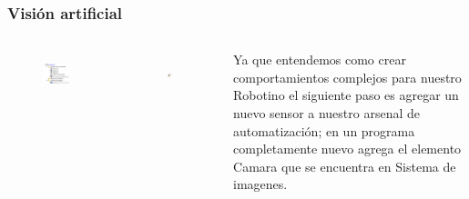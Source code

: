 \begin{frame}
	\frametitle{Visión artificial}
	\begin{columns}
		\begin{figure}
			\begin{center}
				\includegraphics[width=0.8\textwidth]{images/01-vision-artificial/01-01.png}
				\label{fig:vision-01-01}
			\end{center}
		\end{figure}
		\begin{figure}
			\begin{center}
				\includegraphics[width=0.4\textwidth]{images/01-vision-artificial/01-02.png}
				\label{fig:vision-01-02}
			\end{center}
		\end{figure}

		Ya que entendemos como crear comportamientos complejos para nuestro Robotino el siguiente paso es agregar un nuevo sensor a nuestro arsenal de automatización; en un programa completamente nuevo agrega el elemento Camara que se encuentra en Sistema de imagenes.
	\end{columns}
\end{frame}

